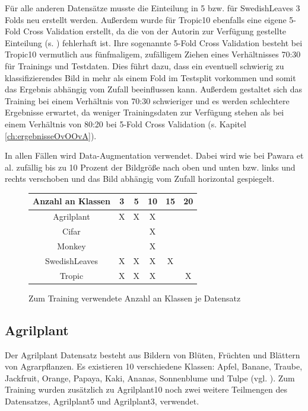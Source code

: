 Für alle anderen Datensätze musste die Einteilung in 5 bzw. für SwedishLeaves 3 Folds neu erstellt werden.
Außerdem wurde für Tropic10 ebenfalls eine eigene 5-Fold Cross Validation erstellt, da die von der Autorin zur Verfügung gestellte Einteilung (s. \cite{pawaraWebsiteDatensaetze}) fehlerhaft ist. Ihre sogenannte 5-Fold Cross Validation besteht bei Tropic10 vermutlich aus fünfmaligem, zufälligem Ziehen eines Verhältnisses 70:30 für Trainings und Testdaten. Dies führt dazu, dass ein eventuell schwierig zu klassifizierendes Bild in mehr als einem Fold im Testsplit vorkommen und somit das Ergebnis abhängig vom Zufall beeinflussen kann. Außerdem gestaltet sich das Training bei einem Verhältnis von 70:30 schwieriger und es werden schlechtere Ergebnisse erwartet, da weniger Trainingsdaten zur Verfügung stehen als bei einem Verhältnis von 80:20 bei 5-Fold Cross Validation (s. Kapitel \ref{ch:ergebnisseOvOOvA}).


In allen Fällen wird Data-Augmentation verwendet. Dabei wird wie bei Pawara et al. \cite{pawaraPaper, pawaraWebsiteCode} zufällig bis zu 10 Prozent der Bildgröße nach oben und unten bzw. links und rechts verschoben und das Bild abhängig vom Zufall horizontal gespiegelt.

\begin{figure}[H]
\begin{tabular}{|c|c|c|c|c|c|}
\hline 
Anzahl an Klassen & 3 & 5 & 10 & 15 & 20 \\ 
\hline 
Agrilplant & X & X & X &  &  \\ 
Cifar &  &  & X &  &  \\ 
Monkey &  &  & X &  &  \\ 
SwedishLeaves & X & X & X & X &  \\ 
Tropic & X & X & X & & X \\ 
\hline 
\end{tabular} 
\caption{Zum Training verwendete Anzahl an Klassen je Datensatz}
\label{fig:DatensatzKlassen}
\end{figure}

\subsection{Agrilplant}
Der Agrilplant Datensatz \cite{pawaraWebsiteDatensaetze} besteht aus Bildern von Blüten, Früchten und Blättern von Agrarpflanzen.
Es existieren 10 verschiedene Klassen: Apfel, Banane, Traube, Jackfruit, Orange, Papaya, Kaki, Ananas, Sonnenblume und Tulpe (vgl. \cite{pawaraWebsiteDatensaetze}).
Zum Training wurden zusätzlich zu Agrilplant10 noch zwei weitere Teilmengen des Datensatzes, Agrilplant5 und Agrilplant3, verwendet.

